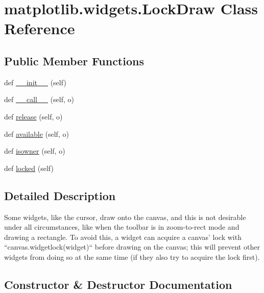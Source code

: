 \hypertarget{classmatplotlib_1_1widgets_1_1LockDraw}{}\section{matplotlib.\+widgets.\+Lock\+Draw Class Reference}
\label{classmatplotlib_1_1widgets_1_1LockDraw}
\subsection*{Public Member Functions}
\begin{DoxyCompactItemize}
\item 
def \hyperlink{classmatplotlib_1_1widgets_1_1LockDraw_a5d2c0ece78617e055aefe47d312b6975}{\+\_\+\+\_\+init\+\_\+\+\_\+} (self)
\item 
def \hyperlink{classmatplotlib_1_1widgets_1_1LockDraw_af7c6d17fe7b52579aeed33ef9528703f}{\+\_\+\+\_\+call\+\_\+\+\_\+} (self, o)
\item 
def \hyperlink{classmatplotlib_1_1widgets_1_1LockDraw_aba45173f1e2599493e7cab0095b26d2e}{release} (self, o)
\item 
def \hyperlink{classmatplotlib_1_1widgets_1_1LockDraw_a5af35f9e7cc7fd8f43927a070db909cd}{available} (self, o)
\item 
def \hyperlink{classmatplotlib_1_1widgets_1_1LockDraw_ab4a0509bc8ae24a9b461b7af8b84e3e3}{isowner} (self, o)
\item 
def \hyperlink{classmatplotlib_1_1widgets_1_1LockDraw_a843b041d8a8d495520865ac411ecd3e0}{locked} (self)
\end{DoxyCompactItemize}


\subsection{Detailed Description}
\begin{DoxyVerb}Some widgets, like the cursor, draw onto the canvas, and this is not
desirable under all circumstances, like when the toolbar is in zoom-to-rect
mode and drawing a rectangle.  To avoid this, a widget can acquire a
canvas' lock with ``canvas.widgetlock(widget)`` before drawing on the
canvas; this will prevent other widgets from doing so at the same time (if
they also try to acquire the lock first).
\end{DoxyVerb}
 

\subsection{Constructor \& Destructor Documentation}
\mbox{\label{classmatplotlib_1_1widgets_1_1LockDraw_a5d2c0ece78617e055aefe47d312b6975}} 

